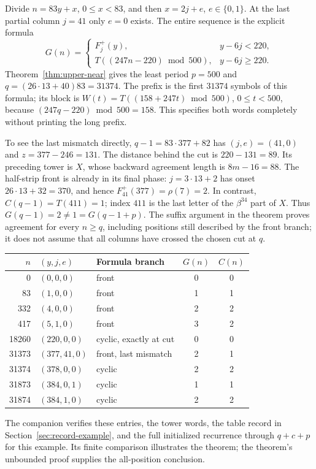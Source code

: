 \documentclass[11pt]{article}
\theoremstyle{remark}\newtheorem{remark}[theorem]{Remark}
\begin{document}
Divide $n=83y+x$, $0\le x<83$, and then $x=2j+e$,
$e\in\{0,1\}$. At the last partial column $j=41$ only $e=0$ exists.
The entire sequence is the explicit formula
\[
G(n)=\begin{cases}F^+_j(y),&y-6j<220,\\
T((247n-220)\bmod500),&y-6j\ge220.
\end{cases}
\]
Theorem~\ref{thm:upper-near} gives the least period $p=500$ and
$q=(26\cdot13+40)83=31374$. The prefix is the first $31374$ symbols
of this formula; its block is $W(t)=T((158+247t)\bmod500)$,
$0\le t<500$, because $(247q-220)\bmod500=158$.
This specifies both words completely without printing the long prefix.

To see the last mismatch directly, $q-1=83\cdot377+82$ has
$(j,e)=(41,0)$ and $z=377-246=131$. The distance behind the cut is
$220-131=89$. Its preceding tower is $X$, whose backward agreement
length is $8m-16=88$. The half-strip front is already in its final
phase: $j=3\cdot13+2$ has onset $26\cdot13+32=370$, and hence
$F^+_{41}(377)=\rho(7)=2$. In contrast,
$C(q-1)=T(411)=1$; index $411$ is the last letter of the
$\beta^{34}$ part of $X$. Thus $G(q-1)=2\ne1=G(q-1+p)$.
The suffix argument in the theorem proves agreement for every $n\ge q$,
including positions still described by the front branch; it does not
assume that all columns have crossed the chosen cut at $q$.

\begin{center}\small
\begin{tabular}{rllcc}\toprule
$n$&$(y,j,e)$&Formula branch&$G(n)$&$C(n)$\\\midrule
0&$(0,0,0)$&front&0&0\\
83&$(1,0,0)$&front&1&1\\
332&$(4,0,0)$&front&2&2\\
417&$(5,1,0)$&front&3&2\\
18260&$(220,0,0)$&cyclic, exactly at cut&0&0\\
31373&$(377,41,0)$&front, last mismatch&2&1\\
31374&$(378,0,0)$&cyclic&2&2\\
31873&$(384,0,1)$&cyclic&1&1\\
31874&$(384,1,0)$&cyclic&2&2\\\bottomrule
\end{tabular}
\end{center}
The companion  verifies these entries, the tower
words, the table record in Section~\ref{sec:record-example}, and the full
initialized recurrence through $q+c+p$ for this example. Its finite
comparison illustrates the theorem; the theorem's unbounded proof supplies
the all-position conclusion.
\end{document}
